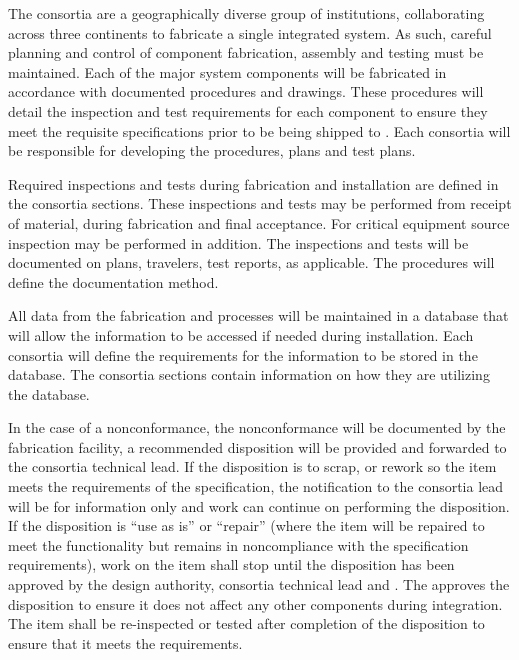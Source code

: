 The  consortia are a geographically diverse group of institutions,
collaborating across three continents to fabricate a single integrated
system. As such, careful planning and control of component
fabrication, assembly and testing must be maintained. Each of the
major system components will be fabricated in accordance with
documented procedures and drawings.  These procedures will detail the
inspection and test requirements for each component to ensure they
meet the requisite specifications prior to be being shipped to .
Each consortia will be responsible for developing the procedures, 
plans and test plans.

Required inspections and tests during fabrication and installation are
defined in the consortia  sections. These inspections and tests may
be performed from receipt of material, during fabrication and final
acceptance. For critical equipment source inspection may be performed
in addition. The inspections and tests will be documented on  plans,
travelers, test reports, as applicable.  The procedures will define
the documentation method.

All data from the fabrication and  processes will be maintained in a
database that will allow the information to be accessed if needed
during installation. Each consortia will define the requirements for
the information to be stored in the database. The consortia 
sections contain information on how they are utilizing the database.

In the case of a nonconformance, the nonconformance will be documented
by the fabrication facility, a recommended disposition will be
provided and forwarded to the consortia technical lead.  If the
disposition is to scrap, or rework so the item meets the requirements
of the specification, the notification to the consortia lead will be
for information only and work can continue on performing the
disposition.  If the disposition is ``use as is'' or ``repair'' (where the
item will be repaired to meet the functionality but remains in
noncompliance with the specification requirements), work on the item
shall stop until the disposition has been approved by the design
authority, consortia technical lead and .  The 
approves the disposition to ensure it does not affect any
other  components during integration. The item shall be
re-inspected or tested after completion of the disposition to ensure
that it meets the requirements.

